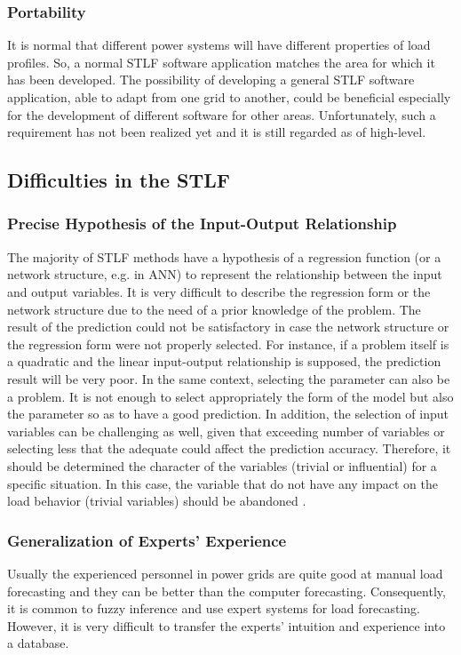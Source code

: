 \subsubsection{Portability}
It is normal that different power systems will have different properties of load profiles. So, a normal STLF software application matches the area for which it has been developed. The possibility of developing a general STLF software application, able to adapt from one grid to another, could be beneficial especially for the development of different software for other areas. Unfortunately, such a requirement has not been realized yet and it is still regarded as of high-level. 

\subsection{Difficulties in the STLF}
\subsubsection{Precise Hypothesis of the Input-Output Relationship}
The majority of STLF methods have a hypothesis of a regression function (or a network structure, e.g. in ANN) to represent the relationship between the input and output variables. It is very difficult to describe the regression form or the network structure due to the need of a prior knowledge of the problem. The result of the prediction could not be satisfactory in case the network structure or the regression form were not properly selected. For instance, if a problem itself is a quadratic and the linear input-output relationship is supposed, the prediction result will be very poor. In the same context, selecting the parameter can also be a problem. It is not enough to select appropriately the form of the model but also the parameter so as to have a good prediction. In addition, the selection of input variables can be challenging as well, given that exceeding number of variables or selecting less that the adequate could affect the prediction accuracy. Therefore, it should be determined the character of the variables (trivial or influential) for a specific situation. In this case, the variable that do not have any impact on the load behavior (trivial variables) should be abandoned \cite{kyriakides2007short}.
\subsubsection{Generalization of Experts’ Experience}
Usually the experienced personnel in power grids are quite good at manual load forecasting and they can be better than the computer forecasting. Consequently, it is common to fuzzy inference and use expert systems for load forecasting. However, it is very difficult to transfer the experts’ intuition and experience into a database.
